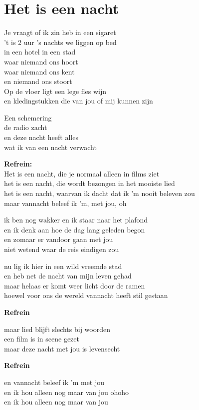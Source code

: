 \section{Het is een nacht}
Je vraagt of ik zin heb in een sigaret\\
't is 2 uur 's nachts we liggen op bed\\
in een hotel in een stad\\
waar niemand ons hoort\\
waar niemand ons kent\\
en niemand ons stoort\\
Op de vloer ligt een lege fles wijn\\
en kledingstukken die van jou of mij kunnen zijn

Een schemering\\
de radio zacht\\
en deze nacht heeft alles\\
wat ik van een nacht verwacht

\textbf{Refrein:}\\
Het is een nacht, die je normaal alleen in films ziet\\
het is een nacht, die wordt bezongen in het mooiste lied\\
het is een nacht, waarvan ik dacht dat ik 'm nooit beleven zou\\
maar vannacht beleef ik 'm, met jou, oh

ik ben nog wakker en ik staar naar het plafond\\
en ik denk aan hoe de dag lang geleden begon\\
en zomaar er vandoor gaan met jou\\
niet wetend waar de reis eindigen zou

nu lig ik hier in een wild vreemde stad\\
en heb net de nacht van mijn leven gehad\\
maar helaas er komt weer licht door de ramen\\
hoewel voor ons de wereld vannacht heeft stil gestaan

\textbf{Refrein}

maar lied blijft slechts bij woorden\\
een film is in scene gezet\\
maar deze nacht met jou is levensecht

\textbf{Refrein}

en vannacht beleef ik 'm met jou\\
en ik hou alleen nog maar van jou ohoho\\
en ik hou alleen nog maar van jou
